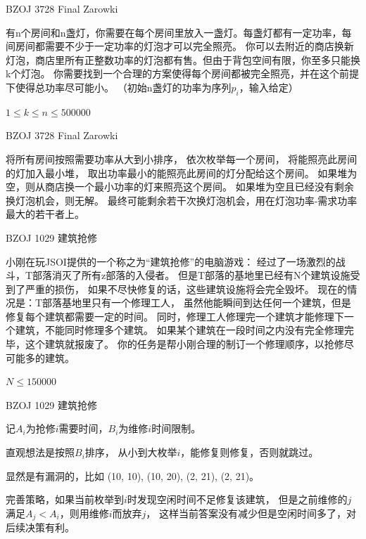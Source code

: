 \documentclass{beamer}
\begin{document}
\begin{frame}{BZOJ 3728 Final Zarowki}

    有n个房间和n盏灯，你需要在每个房间里放入一盏灯。每盏灯都有一定功率，每间房间都需要不少于一定功率的灯泡才可以完全照亮。 
    你可以去附近的商店换新灯泡，商店里所有正整数功率的灯泡都有售。但由于背包空间有限，你至多只能换k个灯泡。 
    你需要找到一个合理的方案使得每个房间都被完全照亮，并在这个前提下使得总功率尽可能小。
    （初始n盏灯的功率为序列$p_i$，输入给定）

    $1 \leq k \leq n \leq 500000$
    
\end{frame}

\begin{frame}{BZOJ 3728 Final Zarowki}

    将所有房间按照需要功率从大到小排序，
    依次枚举每一个房间，
    将能照亮此房间的灯加入最小堆，
    取出功率最小的能照亮此房间的灯分配给这个房间。
    如果堆为空，则从商店换一个最小功率的灯来照亮这个房间。
    如果堆为空且已经没有剩余换灯泡机会，则无解。
    最终可能剩余若干次换灯泡机会，用在灯泡功率-需求功率最大的若干者上。
    
\end{frame}

\begin{frame}{BZOJ 1029 建筑抢修}

    小刚在玩JSOI提供的一个称之为“建筑抢修”的电脑游戏：
    经过了一场激烈的战斗，T部落消灭了所有z部落的入侵者。
    但是T部落的基地里已经有N个建筑设施受到了严重的损伤，
    如果不尽快修复的话，这些建筑设施将会完全毁坏。
    现在的情况是：T部落基地里只有一个修理工人，
    虽然他能瞬间到达任何一个建筑，但是修复每个建筑都需要一定的时间。
    同时，修理工人修理完一个建筑才能修理下一个建筑，不能同时修理多个建筑。
    如果某个建筑在一段时间之内没有完全修理完毕，这个建筑就报废了。
    你的任务是帮小刚合理的制订一个修理顺序，以抢修尽可能多的建筑。

    $N\leq 150000$
    
\end{frame}

\begin{frame}{BZOJ 1029 建筑抢修}

    记$A_i$为抢修$i$需要时间，$B_i$为维修$i$时间限制。

    直观想法是按照$B_i$排序，
    从小到大枚举$i$，能修复则修复，否则就跳过。

    显然是有漏洞的，比如 (10, 10), (10, 20), (2, 21), (2, 21)。

    完善策略，如果当前枚举到$i$时发现空闲时间不足修复该建筑，
    但是之前维修的$j$满足$A_j < A_i$，则用维修$i$而放弃$j$，
    这样当前答案没有减少但是空闲时间多了，对后续决策有利。
    
\end{frame}
\end{document}

